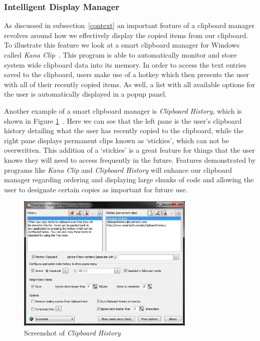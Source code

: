 \documentclass{acm_proc_article-sp}
\begin{document}
\subsubsection{Intelligent Display Manager}\label{display}
As discussed in subsection~\ref{context} an important feature of a clipboard manager revolves around how we effectively display the copied items from our clipboard. To illustrate this feature we look at a smart clipboard manager for Windows called \textit{Kana Clip}~\cite{KanaClip}. This program is able to automatically monitor and store system wide clipboard data into its memory. In order to access the text entries saved to the clipboard, users make use of a hotkey which then presents the user with all of their recently copied items. As well, a list with all available options for the user is automatically displayed in a popup panel. 

Another example of a smart clipboard manager is \textit{Clipboard History}, which is shown in Figure \ref{fig:Clip_History}~\cite{ClipHistory}. Here we can see that the left pane is the user's clipboard history detailing what the user has recently copied to the clipboard, while the right pane displays permanent clips known as `stickies', which can not be overwritten. This addition of a `stickies' is a great feature for things that the user knows they will need to access frequently in the future. Features demonstrated by programs like \textit{Kana Clip} and \textit{Clipboard History} will enhance our clipboard manager regarding ordering and displaying large chunks of code and allowing the user to designate certain copies as important for future use.

\begin{figure}[h]
\centering
\includegraphics[width=8.5cm]{ClipHistory}
\caption{Screenshot of \textit{Clipboard History}}
\label{fig:Clip_History}
\end{figure} 
\end{document}
